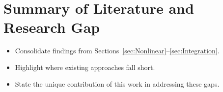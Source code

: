 \section{Summary of Literature and Research Gap}
\begin{itemize}
    \item Consolidate findings from Sections~\ref{sec:Nonlinear}--\ref{sec:Integration}.
    \item Highlight where existing approaches fall short.
    \item State the unique contribution of this work in addressing these gaps.
\end{itemize}
